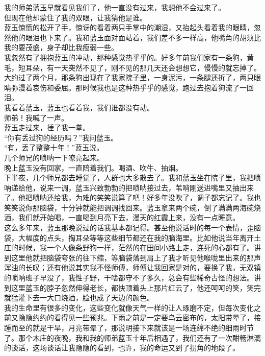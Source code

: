 我的师弟蓝玉早就看见我们了，他一直没有过来，我想他不会过来了。\\

但现在他却蒙住了我的双眼，让我猜他是谁。\\

蓝玉惊慌的松开了手，惊讶的看着两只手掌中的潮湿，又抬起头看着我的眼睛，忽然他的眼泪也下来了。我和蓝玉面对面站着，我们差不多一样高，他嘴角的胡须比我的要茂盛，身子却比我瘦弱一些。\\

我忽然有了拥抱蓝玉的冲动，那种感觉热乎乎的。好多年前我们家有一条狗，黄毛，短耳朵，有一天突然不见了，刚不见的那几天还会想想它，慢慢的就忘掉了。大约过了两个月，那条狗出现在了我家院子里，一身泥污，一条腿还折了，两只眼睛弥漫着哀伤和委屈。那时候我也是这种热乎乎的感觉，跑过去抱着狗流了一回泪。\\

我看着蓝玉，蓝玉也看着我，我们谁都没有动。\\

师弟！我喊了一声。\\

蓝玉走过来，捶了我一拳。\\

“你有丢过狗的经历吗？”我问蓝玉。\\

“有，丢了整整十年！”蓝玉说。\\

几个师兄的唢呐一下嘹亮起来。\\

晚上蓝玉没有回家，一直陪着我们。喝酒、吹牛、抽烟。\\

下半夜，几个师兄都去睡觉了，人群也大多散去了。我和蓝玉坐在院子里，我把唢呐递给他，说来一调，蓝玉兴致勃勃的把唢呐接过去，苇哨刚送进嘴里又抽出来了。他把唢呐还给我，为难的笑笑说算了吧！好多年没吹了，调子都忘记了。我也笑笑说你那脑袋，十分钟就能把调调找回来。蓝玉拿来两个碗，倒了满满两海碗烧酒，我们就开始喝，一直喝到月亮下去，漫天的红霞上来，没有一点睡意。\\

这么多年来，蓝玉那晚说过的话我基本都记得。甚至他说话时的每一个表情，歪脑袋，大幅度的点头，掏耳朵等等这些细节都还在我的脑海里。比如他说当年离开土庄的时候，我一个人像条野狗一样，茫然的在田间小路上走，连死的心都有了。讲到这里他就把脑袋夸张的往下缩，等脑袋落到肩上了我才听见他喉咙里出来的那声浑浊的长叹；还有他说其实我不怪师傅，师傅让我回家是对的，要换了我，无双镇的唢呐班子早没了，我性子野，干啥都守不了多久，总会有些稀奇古怪的想法。讲到这里蓝玉的脖子忽然伸得老长，都快顶着头上那片红云了，他还呵呵的笑，笑完就猛灌下去一大口烧酒，脸也成了天边的颜色。\\

我的生命里有很多的变化，这些变化就像天气一样的让人琢磨不定，但每次变化之前又隐隐约约的看得见一些预兆。下雨之前是一定要乌云密布的，太阳带晕了，接踵而至的就是干旱，月亮带晕了，那说明接下来就该是一场连绵不绝的细雨时节了。那个木庄的夜晚，我和我的师弟蓝玉十年后相遇了，我们还有了一次酣畅淋漓的谈话，这场谈话让我隐隐的看到，也许，我的命运又到了拐角的地段了。\\

